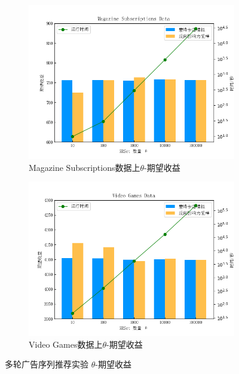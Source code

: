\begin{figure}[th]
    \begin{subfigure}{0.45\textwidth}
       \includegraphics[width=\linewidth]{figure/sasim/theta/cn_magazine}
        \caption{Magazine Subscriptions数据上$\theta$-期望收益}
        \label{fig:thetasub3}
    \end{subfigure}
    \hfill
    \begin{subfigure}{0.45\textwidth}
        \includegraphics[width=\linewidth]{figure/sasim/theta/cn_video}
        \caption{Video Games数据上$\theta$-期望收益}
        \label{fig:thetasub4}
    \end{subfigure}

    \caption{多轮广告序列推荐实验 $\theta$-期望收益}
    \label{fig:theta}
\end{figure}

